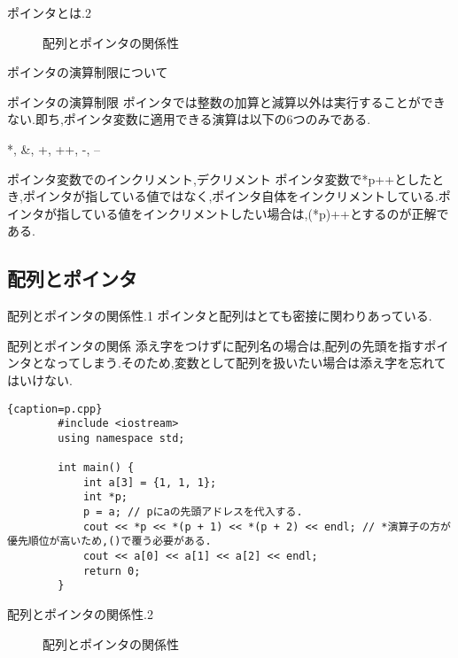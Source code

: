 \documentclass[xdvipdfmx, 8pt, t]{beamer}
\begin{document}
\begin{frame}{ポインタとは.2}
    \begin{figure}[h]
        \centering
        
        \caption{配列とポインタの関係性}
        \label{fig:enter-label}
    \end{figure}
\end{frame}

\begin{frame}{ポインタの演算制限について}
    \begin{block}{ポインタの演算制限}
        ポインタでは整数の加算と減算以外は実行することができない.即ち,ポインタ変数に適用できる演算は以下の6つのみである.

        \centering
            *, \&, +, ++, -, --
    \end{block}
    \begin{alertblock}{ポインタ変数でのインクリメント,デクリメント}
        ポインタ変数で*p++としたとき,ポインタが指している値ではなく,ポインタ自体をインクリメントしている.ポインタが指している値をインクリメントしたい場合は,(*p)++とするのが正解である.

    \end{alertblock}
\end{frame}

\subsection{配列とポインタ}
\begin{frame}[fragile]{配列とポインタの関係性.1}
ポインタと配列はとても密接に関わりあっている.
\begin{block}{配列とポインタの関係}
    添え字をつけずに配列名の場合は,配列の先頭を指すポインタとなってしまう.そのため,変数として配列を扱いたい場合は添え字を忘れてはいけない.
\end{block}
    \begin{lstlisting}{caption=p.cpp}
        #include <iostream>
        using namespace std;

        int main() {
            int a[3] = {1, 1, 1};
            int *p;
            p = a; // pにaの先頭アドレスを代入する.
            cout << *p << *(p + 1) << *(p + 2) << endl; // *演算子の方が優先順位が高いため,()で覆う必要がある.
            cout << a[0] << a[1] << a[2] << endl;
            return 0;
        }
    \end{lstlisting}
\end{frame}

\begin{frame}{配列とポインタの関係性.2}
    \begin{figure}[h]
        \centering
        
        \caption{配列とポインタの関係性}
        \label{fig:enter-label}
    \end{figure}
\end{frame}
\end{document}
